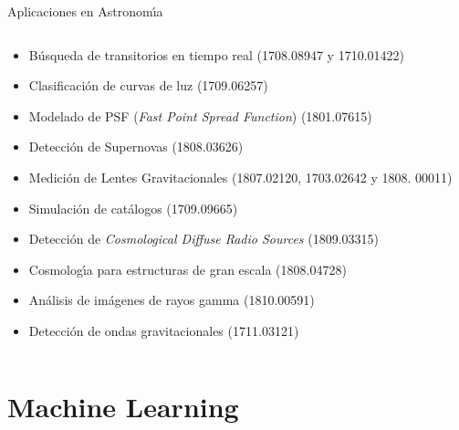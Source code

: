 \documentclass[11pt]{beamer}
\begin{document}
\begin{frame}{Aplicaciones en Astronom\'{\i}a}
\begin{columns}
\begin{column}{0.7\textwidth}
{\begin{itemize}
	    \item B\'usqueda de transitorios en tiempo real (1708.08947 y 1710.01422)
        \item Clasificaci\'on de curvas de luz (1709.06257)
        \item Modelado de PSF (\textit{Fast Point Spread Function}) (1801.07615)
        \item Detecci\'on de Supernovas (1808.03626)
        \item Medici\'on de Lentes Gravitacionales (1807.02120, 1703.02642 y 1808. 00011)
        \item Simulaci\'on de cat\'alogos (1709.09665)
        \item Detecci\'on de \textit{Cosmological Diffuse Radio Sources} (1809.03315)
        \item Cosmolog\'{\i}a para estructuras de gran escala (1808.04728)
        \item An\'alisis de im\'agenes de rayos gamma (1810.00591)
        \item Detecci\'on de ondas gravitacionales (1711.03121)
	\end{itemize}
	\normalsize
	}
	\end{column}
	
\end{columns}
\end{frame}	
\section{Machine Learning}
\end{document}
